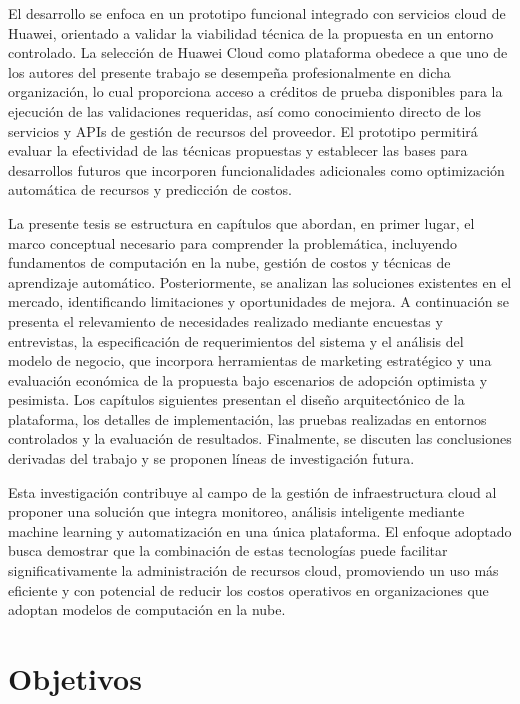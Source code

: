 El desarrollo se enfoca en un prototipo funcional integrado con servicios cloud de Huawei, orientado a validar la viabilidad técnica de la propuesta en un entorno controlado. La selección de Huawei Cloud como plataforma obedece a que uno de los autores del presente trabajo se desempeña profesionalmente en dicha organización, lo cual proporciona acceso a créditos de prueba disponibles para la ejecución de las validaciones requeridas, así como conocimiento directo de los servicios y APIs de gestión de recursos del proveedor. El prototipo permitirá evaluar la efectividad de las técnicas propuestas y establecer las bases para desarrollos futuros que incorporen funcionalidades adicionales como optimización automática de recursos y predicción de costos.

La presente tesis se estructura en capítulos que abordan, en primer lugar, el marco conceptual necesario para comprender la problemática, incluyendo fundamentos de computación en la nube, gestión de costos y técnicas de aprendizaje automático. Posteriormente, se analizan las soluciones existentes en el mercado, identificando limitaciones y oportunidades de mejora. A continuación se presenta el relevamiento de necesidades realizado mediante encuestas y entrevistas, la especificación de requerimientos del sistema y el análisis del modelo de negocio, que incorpora herramientas de marketing estratégico y una evaluación económica de la propuesta bajo escenarios de adopción optimista y pesimista. Los capítulos siguientes presentan el diseño arquitectónico de la plataforma, los detalles de implementación, las pruebas realizadas en entornos controlados y la evaluación de resultados. Finalmente, se discuten las conclusiones derivadas del trabajo y se proponen líneas de investigación futura.

Esta investigación contribuye al campo de la gestión de infraestructura cloud al proponer una solución que integra monitoreo, análisis inteligente mediante machine learning y automatización en una única plataforma. El enfoque adoptado busca demostrar que la combinación de estas tecnologías puede facilitar significativamente la administración de recursos cloud, promoviendo un uso más eficiente y con potencial de reducir los costos operativos en organizaciones que adoptan modelos de computación en la nube.

\section{Objetivos}

